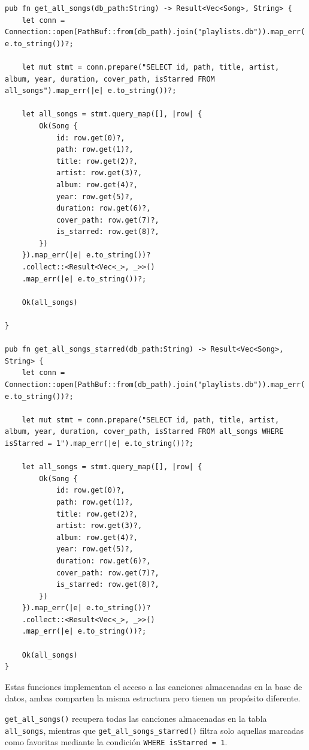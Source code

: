 \documentclass[11pt, a4paper]{article}
\begin{document}
            \begin{lstlisting}[caption={fn get\_all\_songs() y fn get\_all\_songs\_starred()}]
pub fn get_all_songs(db_path:String) -> Result<Vec<Song>, String> {
    let conn = Connection::open(PathBuf::from(db_path).join("playlists.db")).map_err(|e| e.to_string())?;

    let mut stmt = conn.prepare("SELECT id, path, title, artist, album, year, duration, cover_path, isStarred FROM all_songs").map_err(|e| e.to_string())?;

    let all_songs = stmt.query_map([], |row| {
        Ok(Song {
            id: row.get(0)?,
            path: row.get(1)?,
            title: row.get(2)?,
            artist: row.get(3)?,
            album: row.get(4)?,
            year: row.get(5)?,
            duration: row.get(6)?,
            cover_path: row.get(7)?,
            is_starred: row.get(8)?,
        })
    }).map_err(|e| e.to_string())?
    .collect::<Result<Vec<_>, _>>()
    .map_err(|e| e.to_string())?;

    Ok(all_songs)

}

pub fn get_all_songs_starred(db_path:String) -> Result<Vec<Song>, String> {
    let conn = Connection::open(PathBuf::from(db_path).join("playlists.db")).map_err(|e| e.to_string())?;

    let mut stmt = conn.prepare("SELECT id, path, title, artist, album, year, duration, cover_path, isStarred FROM all_songs WHERE isStarred = 1").map_err(|e| e.to_string())?;

    let all_songs = stmt.query_map([], |row| {
        Ok(Song {
            id: row.get(0)?,
            path: row.get(1)?,
            title: row.get(2)?,
            artist: row.get(3)?,
            album: row.get(4)?,
            year: row.get(5)?,
            duration: row.get(6)?,
            cover_path: row.get(7)?,
            is_starred: row.get(8)?,
        })
    }).map_err(|e| e.to_string())?
    .collect::<Result<Vec<_>, _>>()
    .map_err(|e| e.to_string())?;

    Ok(all_songs)
}
            \end{lstlisting}

            Estas funciones implementan el acceso a las canciones almacenadas en la base de datos, ambas comparten la misma estructura pero tienen un propósito diferente.

            \verb|get_all_songs()| recupera todas las canciones almacenadas en la tabla \verb|all_songs|, mientras que \verb|get_all_songs_starred()| filtra solo aquellas marcadas como favoritas mediante la condición \verb|WHERE isStarred = 1|.
\end{document}
